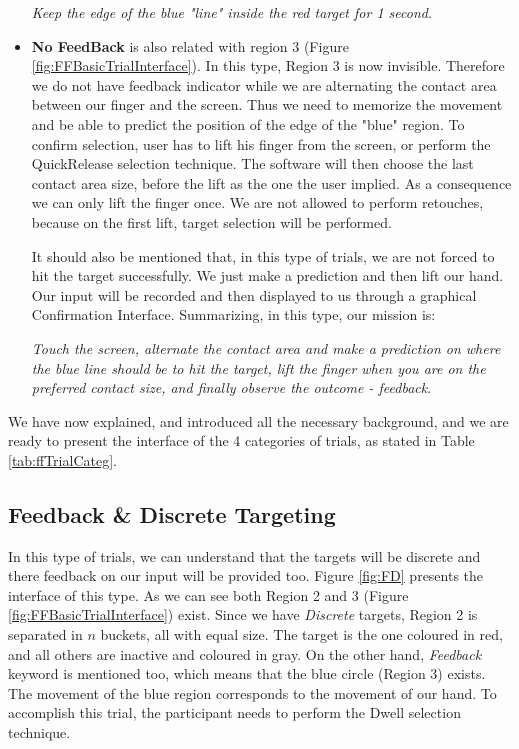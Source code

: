 \begin{itemize}
	\emph{Keep the edge of the blue "line" inside the red target for 1 second}.

	\item \textbf{No FeedBack} is also related with region 3 (Figure \ref{fig:FFBasicTrialInterface}). In this type, Region 3 is now invisible. Therefore we do not have feedback indicator while we are alternating the contact area between our finger and the screen. Thus we need to memorize the movement and be able to predict the position of the edge of the "blue" region. To confirm selection, user has to lift his finger from the screen, or perform the QuickRelease selection technique. The software will then choose the last contact area size,  before the lift as the one the user implied. As a consequence we can only lift the finger once. We are not allowed to perform retouches, because on the first lift, target selection will be performed. 

	It should also be mentioned that, in this type of trials, we are not forced to hit the target successfully. We just make a prediction and then lift our hand. Our input will be recorded and then displayed to us through a graphical Confirmation Interface.  Summarizing, in this type, our mission is:

	\emph{Touch the screen, alternate the contact area and make a prediction on where the blue line should be to hit the target, lift the finger when you are on the preferred contact size, and finally observe the outcome - feedback}.
\end{itemize}

We have now explained, and introduced all the necessary background, and we are ready to present the interface of the 4 categories of trials, as stated in Table \ref{tab:ffTrialCateg}.


\subsection{Feedback \& Discrete Targeting}


In this type of trials, we can understand that the targets will be discrete and there feedback on our input will be provided too. Figure \ref{fig:FD} presents the interface of this type. As we can see both Region 2 and 3 (Figure \ref{fig:FFBasicTrialInterface}) exist. Since we have \emph{Discrete} targets, Region 2 is separated in $n$ buckets, all with equal size. The target is the one coloured in red, and all others are inactive and coloured in gray. On the other hand, \emph{Feedback} keyword is mentioned too, which means that the blue circle (Region 3) exists. The movement of the blue region corresponds to the movement of our hand. To accomplish this trial, the participant needs to perform the Dwell selection technique.

